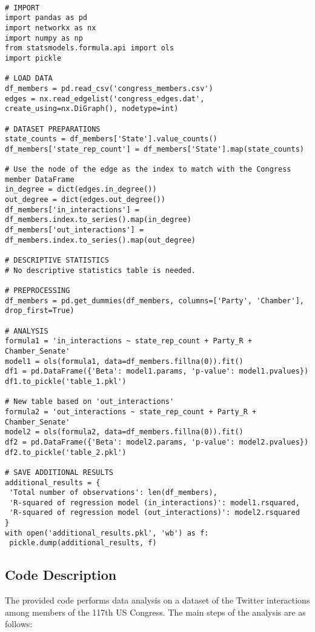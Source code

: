 \documentclass[11pt]{article}
\begin{document}
\begin{verbatim}

# IMPORT
import pandas as pd
import networkx as nx
import numpy as np
from statsmodels.formula.api import ols
import pickle

# LOAD DATA
df_members = pd.read_csv('congress_members.csv')
edges = nx.read_edgelist('congress_edges.dat', create_using=nx.DiGraph(), nodetype=int)

# DATASET PREPARATIONS
state_counts = df_members['State'].value_counts()
df_members['state_rep_count'] = df_members['State'].map(state_counts)

# Use the node of the edge as the index to match with the Congress member DataFrame
in_degree = dict(edges.in_degree())
out_degree = dict(edges.out_degree())
df_members['in_interactions'] = df_members.index.to_series().map(in_degree)
df_members['out_interactions'] = df_members.index.to_series().map(out_degree)

# DESCRIPTIVE STATISTICS
# No descriptive statistics table is needed.

# PREPROCESSING
df_members = pd.get_dummies(df_members, columns=['Party', 'Chamber'], drop_first=True)

# ANALYSIS
formula1 = 'in_interactions ~ state_rep_count + Party_R + Chamber_Senate'
model1 = ols(formula1, data=df_members.fillna(0)).fit()
df1 = pd.DataFrame({'Beta': model1.params, 'p-value': model1.pvalues})
df1.to_pickle('table_1.pkl')

# New table based on 'out_interactions'
formula2 = 'out_interactions ~ state_rep_count + Party_R + Chamber_Senate'
model2 = ols(formula2, data=df_members.fillna(0)).fit()
df2 = pd.DataFrame({'Beta': model2.params, 'p-value': model2.pvalues})
df2.to_pickle('table_2.pkl')

# SAVE ADDITIONAL RESULTS
additional_results = {
 'Total number of observations': len(df_members),
 'R-squared of regression model (in_interactions)': model1.rsquared, 
 'R-squared of regression model (out_interactions)': model2.rsquared 
}
with open('additional_results.pkl', 'wb') as f:
 pickle.dump(additional_results, f)

\end{verbatim}

\subsection{Code Description}

The provided code performs data analysis on a dataset of the Twitter interactions among members of the 117th US Congress. The main steps of the analysis are as follows:
\end{document}
